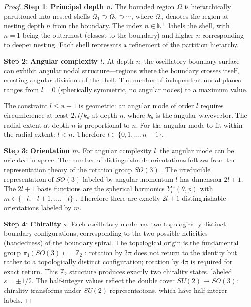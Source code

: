 \documentclass[11pt,twocolumn,a4paper]{article}
\theoremstyle{definition}
\theoremstyle{remark}
\newcommand{\Natural}{\mathbb{N}}
\newcommand{\Integer}{\mathbb{Z}}
\begin{document}
\begin{proof}
\textbf{Step 1: Principal depth $n$.} The bounded region $\Omega$ is hierarchically partitioned into nested shells $\Omega_1 \supset \Omega_2 \supset \cdots$, where $\Omega_n$ denotes the region at nesting depth $n$ from the boundary. The index $n \in \Natural^+$ labels the shell, with $n = 1$ being the outermost (closest to the boundary) and higher $n$ corresponding to deeper nesting. Each shell represents a refinement of the partition hierarchy.

\textbf{Step 2: Angular complexity $l$.} At depth $n$, the oscillatory boundary surface can exhibit angular nodal structure---regions where the boundary crosses itself, creating angular divisions of the shell. The number of independent nodal planes ranges from $l = 0$ (spherically symmetric, no angular nodes) to a maximum value.

The constraint $l \leq n - 1$ is geometric: an angular mode of order $l$ requires circumference at least $2\pi l / k_\theta$ at depth $n$, where $k_\theta$ is the angular wavevector. The radial extent at depth $n$ is proportional to $n$. For the angular mode to fit within the radial extent: $l < n$. Therefore $l \in \{0, 1, \ldots, n-1\}$.

\textbf{Step 3: Orientation $m$.} For angular complexity $l$, the angular mode can be oriented in space. The number of distinguishable orientations follows from the representation theory of the rotation group $SO(3)$ \citep{hall2015, wigner1959}. The irreducible representation of $SO(3)$ labeled by angular momentum $l$ has dimension $2l + 1$. The $2l + 1$ basis functions are the spherical harmonics $Y_l^m(\theta, \phi)$ with $m \in \{-l, -l+1, \ldots, +l\}$ \citep{griffiths2018}. Therefore there are exactly $2l + 1$ distinguishable orientations labeled by $m$.

\textbf{Step 4: Chirality $s$.} Each oscillatory mode has two topologically distinct boundary configurations, corresponding to the two possible helicities (handedness) of the boundary spiral. The topological origin is the fundamental group $\pi_1(SO(3)) = \Integer_2$ \citep{nakahara2003}: rotation by $2\pi$ does not return to the identity but rather to a topologically distinct configuration; rotation by $4\pi$ is required for exact return. This $\Integer_2$ structure produces exactly two chirality states, labeled $s = \pm 1/2$. The half-integer values reflect the double cover $SU(2) \to SO(3)$: chirality transforms under $SU(2)$ representations, which have half-integer labels.
\end{proof}
\end{document}
